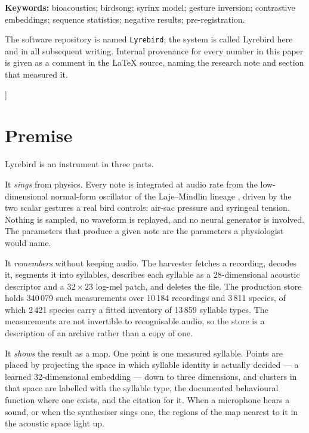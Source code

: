 \documentclass[10pt,twocolumn,a4paper]{article}
\begin{document}
\begin{@twocolumnfalse}
\noindent\textbf{Keywords:} bioacoustics; birdsong; syrinx model; gesture inversion;
contrastive embeddings; sequence statistics; negative results; pre-registration.

\vspace{1em}
\noindent\small
The software repository is named \texttt{Lyrebird}; the system is called Lyrebird here and
in all subsequent writing. Internal provenance for every number in this paper is given
as a comment in the \LaTeX{} source, naming the research note and section that measured
it.
\normalsize
\vspace{1.4em}
\end{@twocolumnfalse}]
\makeatother

\section{Premise}
\label{sec:premise}

Lyrebird is an instrument in three parts.

It \emph{sings} from physics. Every note is integrated at audio rate from the
low-dimensional normal-form oscillator of the Laje--Mindlin
lineage \citep{gardner2001,laje2002a,laje2002b,mindlin2005}, driven by the two
scalar gestures a real bird controls: air-sac pressure and syringeal tension. Nothing
is sampled, no waveform is replayed, and no neural generator is involved. The parameters
that produce a given note are the parameters a physiologist would name.

It \emph{remembers} without keeping audio. The harvester fetches a recording, decodes it,
segments it into syllables, describes each syllable as a 28-dimensional acoustic
descriptor and a $32 \times 23$ log-mel patch, and deletes the file. The production store
holds 340\,079 such measurements over 10\,184 recordings and 3\,811 species, of which
2\,421 species carry a fitted inventory of 13\,859 syllable types.
The measurements are not invertible to recognisable audio, so the store is a description
of an archive rather than a copy of one.

It \emph{shows} the result as a map. One point is one measured syllable. Points are placed
by projecting the space in which syllable identity is actually decided --- a learned
32-dimensional embedding --- down to three dimensions, and clusters in that space are
labelled with the syllable type, the documented behavioural function where one exists, and
the citation for it. When a microphone hears a sound, or when the synthesiser sings one,
the regions of the map nearest to it in the acoustic space light up.
\end{document}
